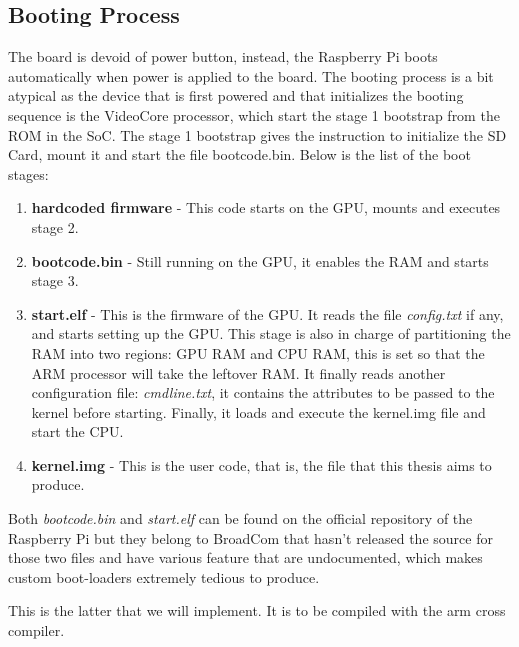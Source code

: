 \subsection{Booting Process}\label{chapter2_booting_process}
The board is devoid of power button, instead, the Raspberry Pi boots automatically when power is applied to the board. The booting process is a bit atypical as the device that is first powered and that initializes the booting sequence is the VideoCore processor, which start the stage 1 bootstrap from the ROM in the SoC. The stage 1 bootstrap gives the instruction to initialize the SD Card, mount it and start the file bootcode.bin. 
Below is the list of the boot stages:
\begin{enumerate}
  \item\textbf{hardcoded firmware} - This code starts on the GPU, mounts and executes stage 2.
  \item\textbf{bootcode.bin} - Still running on the GPU, it enables the RAM and starts stage 3.
  \item\textbf{start.elf} - This is the firmware of the GPU. It reads the file \textit{config.txt} if any, and starts setting up the GPU. This stage is also in charge of partitioning the RAM into two regions: GPU RAM and CPU RAM, this is set so that the ARM processor will take the leftover RAM. It finally reads another configuration file: \textit{cmdline.txt}, it contains the attributes to be passed to the kernel before starting. Finally, it loads and execute the kernel.img file and start the CPU.
  \item\textbf{kernel.img} - This is the user code, that is, the file that this thesis aims to produce.
\end{enumerate}


Both \textit{bootcode.bin} and \textit{start.elf} can be found on the official repository of the Raspberry Pi\cite{firmware_boot} but they belong to BroadCom that hasn't released the source for those two files and have various feature that are undocumented, which makes custom boot-loaders extremely tedious to produce.

This is the latter that we will implement. It is to be compiled with the arm cross compiler\cite{osdev_raspberry_pi}.

